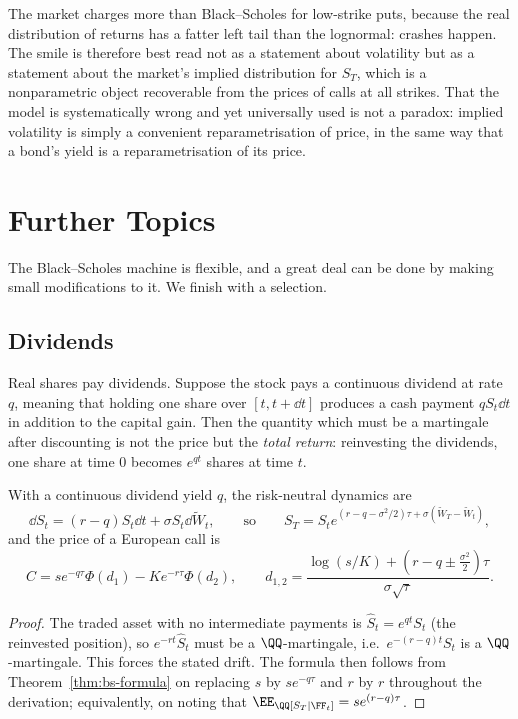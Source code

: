 The market charges more than Black--Scholes for low-strike puts, because the real distribution of returns has a fatter left tail than the lognormal: crashes happen. The smile is therefore best read not as a statement about volatility but as a statement about the market's implied distribution for $S_T$, which is a nonparametric object recoverable from the prices of calls at all strikes. That the model is systematically wrong and yet universally used is not a paradox: implied volatility is simply a convenient reparametrisation of price, in the same way that a bond's yield is a reparametrisation of its price.

\section{Further Topics}

The Black--Scholes machine is flexible, and a great deal can be done by making small modifications to it. We finish with a selection.

\subsection{Dividends}

Real shares pay dividends. Suppose the stock pays a continuous dividend at rate $q$, meaning that holding one share over $[t,t+\dd t]$ produces a cash payment $qS_t\dd t$ in addition to the capital gain. Then the quantity which must be a martingale after discounting is not the price but the \emph{total return}: reinvesting the dividends, one share at time $0$ becomes $e^{qt}$ shares at time $t$.

\begin{proposition}
	With a continuous dividend yield $q$, the risk-neutral dynamics are
	$$
	\dd S_t = (r-q)S_t\dd t + \sigma S_t\dd\tilde W_t,\qquad\text{so}\qquad S_T = S_te^{(r-q-\sigma^2/2)\tau + \sigma(\tilde W_T-\tilde W_t)},
	$$
	and the price of a European call is
	$$
	C = se^{-q\tau}\Phi(d_1) - Ke^{-r\tau}\Phi(d_2), \qquad d_{1,2} = \frac{\log(s/K) + (r - q\pm\tfrac{\sigma^2}{2})\tau}{\sigma\sqrt\tau}.
	$$
\end{proposition}

\begin{proof}
	The traded asset with no intermediate payments is $\hat S_t = e^{qt}S_t$ (the reinvested position), so $e^{-rt}\hat S_t$ must be a $\QQ$-martingale, i.e.\ $e^{-(r-q)t}S_t$ is a $\QQ$-martingale. This forces the stated drift. The formula then follows from Theorem~\ref{thm:bs-formula} on replacing $s$ by $se^{-q\tau}$ and $r$ by $r$ throughout the derivation; equivalently, on noting that $\EE_\QQ[S_T\mid\FF_t] = se^{(r-q)\tau}$.
\end{proof}

